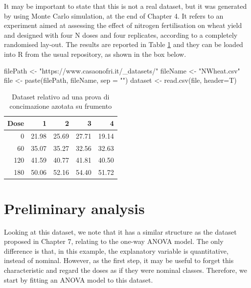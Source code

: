 \documentclass[a4paper,12pt,oneside]{book}
\newenvironment{Shaded}{\begin{snugshade}}{\end{snugshade}}
\newcommand{\StringTok}[1]{#1}
\newcommand{\OtherTok}[1]{#1}
\newcommand{\FunctionTok}[1]{#1}
\newcommand{\AttributeTok}[1]{#1}
\newcommand{\NormalTok}[1]{#1}
\begin{document}
It may be important to state that this is not a real dataset, but it was generated by using Monte Carlo simulation, at the end of Chapter 4. It refers to an experiment aimed at assessing the effect of nitrogen fertilisation on wheat yield and designed with four N doses and four replicates, according to a completely randomised lay-out. The results are reported in Table \ref{tab:tabName141} and they can be loaded into R from the usual repository, as shown in the box below.

\begin{Shaded}
\begin{Highlighting}[]
\NormalTok{filePath }\OtherTok{\textless{}{-}} \StringTok{"https://www.casaonofri.it/\_datasets/"}
\NormalTok{fileName }\OtherTok{\textless{}{-}} \StringTok{"NWheat.csv"}
\NormalTok{file }\OtherTok{\textless{}{-}} \FunctionTok{paste}\NormalTok{(filePath, fileName, }\AttributeTok{sep =} \StringTok{""}\NormalTok{)}
\NormalTok{dataset }\OtherTok{\textless{}{-}} \FunctionTok{read.csv}\NormalTok{(file, }\AttributeTok{header=}\NormalTok{T)}
\end{Highlighting}
\end{Shaded}

\begin{table}

\caption{\label{tab:tabName141}Dataset relativo ad una prova di concimazione azotata su frumento}
\centering
\begin{tabular}[t]{rrrrr}
\toprule
Dose & 1 & 2 & 3 & 4\\
\midrule
0 & 21.98 & 25.69 & 27.71 & 19.14\\
60 & 35.07 & 35.27 & 32.56 & 32.63\\
120 & 41.59 & 40.77 & 41.81 & 40.50\\
180 & 50.06 & 52.16 & 54.40 & 51.72\\
\bottomrule
\end{tabular}
\end{table}

\hypertarget{preliminary-analysis}{%
\section{Preliminary analysis}\label{preliminary-analysis}}

Looking at this dataset, we note that it has a similar structure as the dataset proposed in Chapter 7, relating to the one-way ANOVA model. The only difference is that, in this example, the explanatory variable is quantitative, instead of nominal. However, as the first step, it may be useful to forget this characteristic and regard the doses as if they were nominal classes. Therefore, we start by fitting an ANOVA model to this dataset.
\end{document}

